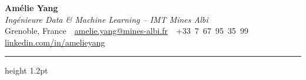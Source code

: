 \documentclass[10.5pt,a4paper]{article}
\begin{document}
\begin{center}
  {\fontsize{26}{30}\selectfont\bfseries Amélie Yang}\\[4pt]
  {\color{accent}\itshape\large Ingénieure Data \& Machine Learning -- IMT Mines Albi}\\[6pt]
  {\small
    Grenoble, France
    \,\textbullet\,
    \href{mailto:amelie.yang@mines-albi.fr}{amelie.yang@mines-albi.fr}
    \,\textbullet\,
    +33~7~67~95~35~99
    \,\textbullet\,
    \href{https://www.linkedin.com/in/amelieyang}{linkedin.com/in/amelieyang}
  }
\end{center}

\vspace{3pt}
{\color{accent}\hrule height 1.2pt}
\vspace{4pt}
\end{document}

